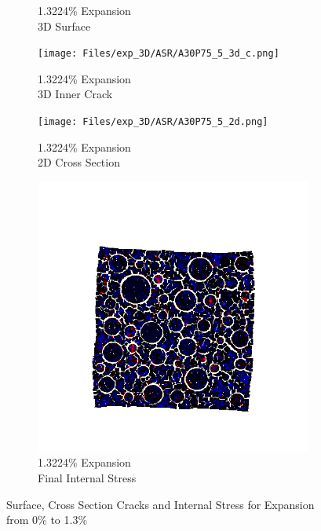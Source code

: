 \begin{figure}[ht!]
\begin{subfigure}{.25\textwidth}
      \caption{1.3224\% Expansion\\3D Surface}
    \end{subfigure}%
    \begin{subfigure}{.25\textwidth}
      \centering
      \texttt{[image: Files/exp\_3D/ASR/A30P75\_5\_3d\_c.png]}
      \caption{1.3224\% Expansion\\3D Inner Crack}
    \end{subfigure}%
    \begin{subfigure}{.25\textwidth}
      \centering
      \texttt{[image: Files/exp\_3D/ASR/A30P75\_5\_2d.png]}
      \caption{1.3224\% Expansion\\2D Cross Section}
    \end{subfigure}%
    \begin{subfigure}{.25\textwidth}
      \centering
      \includegraphics[width=.8\linewidth]{Files/exp_3D/ASR/A30P75_5_stress.png}
      \caption{1.3224\% Expansion\\Final Internal Stress}
    \end{subfigure}

\caption{Surface, Cross Section Cracks and Internal Stress for Expansion from 0\% to 1.3\%}
\label{fig:A30_3D_exp}
\end{figure}


